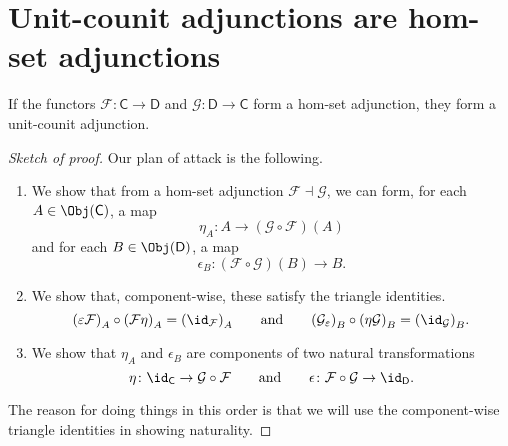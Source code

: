 \documentclass[notes.tex]{subfiles}
\begin{document}
\section{Unit-counit adjunctions are hom-set adjunctions}
\label{sec:unit_counit_adjunctions_are_hom_set_adjunctions}

\begin{lemma}
  \label{lemma:hom-set_adjunction_implies_unit-counit_adjunction}
  If the functors $\mathcal{F}\colon \mathsf{C} \to \mathsf{D}$ and $\mathcal{G}\colon \mathsf{D} \to \mathsf{C}$ form a hom-set adjunction, they form a unit-counit adjunction.
\end{lemma}
\begin{proof}[Sketch of proof]
  Our plan of attack is the following.
  \begin{enumerate}
    \item We show that from a hom-set adjunction $\mathcal{F} \dashv \mathcal{G}$, we can form, for each $A \in \Obj(\mathsf{C})$, a map
      \begin{equation*}
        \eta_{A}\colon A \to (\mathcal{G} \circ \mathcal{F})(A)
      \end{equation*}
      and for each $B \in \Obj(\mathsf{D})$, a map
      \begin{equation*}
        \epsilon_{B}\colon (\mathcal{F} \circ \mathcal{G})(B) \to B.
      \end{equation*}

    \item We show that, component-wise, these satisfy the triangle identities.
      \begin{equation*}
        {(\varepsilon\mathcal{F})}_{A} \circ {(\mathcal{F}\eta)}_{A} = {(\id_{\mathcal{F}})}_{A}\qquad\text{and}\qquad {(\mathcal{G}_{\varepsilon})}_{B} \circ {(\eta\mathcal{G})}_{B} = {(\id_{\mathcal{G}})}_{B}.
      \end{equation*}

    \item We show that $\eta_{A}$ and $\epsilon_{B}$ are components of two natural transformations 
      \begin{equation*}
        \eta\colon \id_{\mathsf{C}} \to \mathcal{G} \circ \mathcal{F} \qquad \text{and}\qquad \epsilon\colon \mathcal{F} \circ \mathcal{G} \to \id_{\mathsf{D}}.
      \end{equation*}
  \end{enumerate}
  The reason for doing things in this order is that we will use the component-wise triangle identities in showing naturality.
\end{proof}
\end{document}
